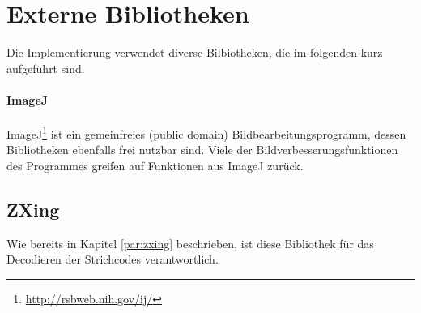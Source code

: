 \section{Externe Bibliotheken}
Die Implementierung verwendet diverse Bilbiotheken, die im folgenden kurz aufgeführt sind.

\paragraph{ImageJ}
ImageJ\footnote{\url{http://rsbweb.nih.gov/ij/}} ist ein gemeinfreies (public domain) Bildbearbeitungsprogramm, dessen Bibliotheken ebenfalls frei nutzbar sind.
Viele der Bildverbesserungsfunktionen des Programmes greifen auf Funktionen aus ImageJ zurück.

\subsection*{ZXing}
Wie bereits in Kapitel \ref{par:zxing} beschrieben, ist diese Bibliothek für das Decodieren der Strichcodes verantwortlich.


